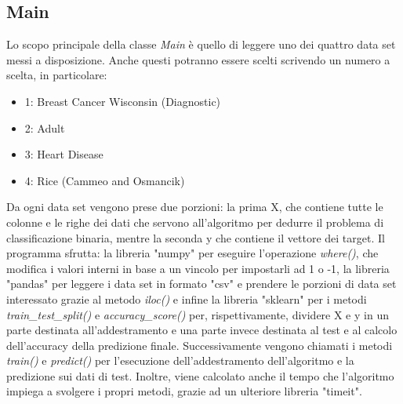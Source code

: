 \documentclass{article}
\begin{document}
    \subsection{Main}
	Lo scopo principale della classe \textit{Main} è quello di leggere uno dei quattro data set messi a disposizione. Anche questi potranno essere scelti scrivendo un numero a scelta, in particolare:
	\begin{itemize}
		\item 1: Breast Cancer Wisconsin (Diagnostic)
		\item 2: Adult
		\item 3: Heart Disease
		\item 4: Rice (Cammeo and Osmancik)
	\end{itemize}
	Da ogni data set vengono prese due porzioni: la prima X, che contiene tutte le colonne e le righe dei dati che servono all'algoritmo per dedurre il problema di classificazione binaria, mentre la seconda y che contiene il vettore dei target. Il programma sfrutta: la libreria "numpy" per eseguire l'operazione \textit{where()}, che modifica i valori interni in base a un vincolo per impostarli ad 1 o -1, la libreria "pandas" per leggere i data set in formato "csv" e prendere le porzioni di data set interessato grazie al metodo \textit{iloc()} e infine la libreria "sklearn" per i metodi \textit{train\_test\_split()} e \textit{accuracy\_score()} per, rispettivamente, dividere X e y in un parte destinata all'addestramento e una parte invece destinata al test e al calcolo dell'accuracy della predizione finale.
	Successivamente vengono chiamati i metodi \textit{train()} e \textit{predict()} per l'esecuzione dell'addestramento dell'algoritmo e la predizione sui dati di test. Inoltre, viene calcolato anche il tempo che l'algoritmo impiega a svolgere i propri metodi, grazie ad un ulteriore libreria "timeit".
\end{document}
